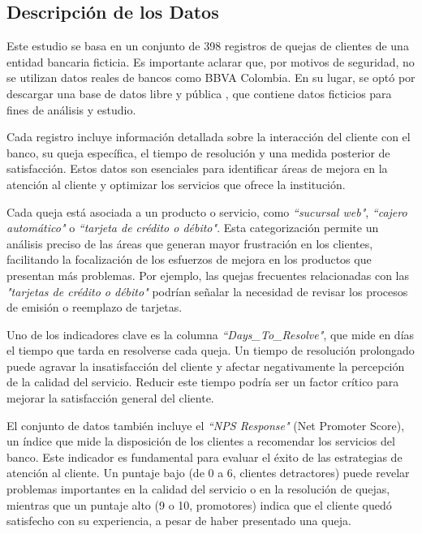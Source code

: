 \documentclass{matematicasud}
\begin{document}
\subsection{Descripción de los Datos}

Este estudio se basa en un conjunto de 398 registros de quejas de clientes de una entidad bancaria ficticia. Es importante aclarar que, por motivos de seguridad, no se utilizan datos reales de bancos como BBVA Colombia. En su lugar, se optó por descargar una base de datos libre y pública \cite{7}, que contiene datos ficticios para fines de análisis y estudio.

Cada registro incluye información detallada sobre la interacción del cliente con el banco, su queja específica, el tiempo de resolución y una medida posterior de satisfacción. Estos datos son esenciales para identificar áreas de mejora en la atención al cliente y optimizar los servicios que ofrece la institución.

Cada queja está asociada a un producto o servicio, como \textit{``sucursal web"}, \textit{``cajero automático"} o \textit{``tarjeta de crédito o débito"}. Esta categorización permite un análisis preciso de las áreas que generan mayor frustración en los clientes, facilitando la focalización de los esfuerzos de mejora en los productos que presentan más problemas. Por ejemplo, las quejas frecuentes relacionadas con las \textit{"tarjetas de crédito o débito"} podrían señalar la necesidad de revisar los procesos de emisión o reemplazo de tarjetas.

Uno de los indicadores clave es la columna \textit{``Days\_To\_Resolve"}, que mide en días el tiempo que tarda en resolverse cada queja. Un tiempo de resolución prolongado puede agravar la insatisfacción del cliente y afectar negativamente la percepción de la calidad del servicio. Reducir este tiempo podría ser un factor crítico para mejorar la satisfacción general del cliente.

El conjunto de datos también incluye el \textit{``NPS Response"} (Net Promoter Score)\cite{5}, un índice que mide la disposición de los clientes a recomendar los servicios del banco. Este indicador es fundamental para evaluar el éxito de las estrategias de atención al cliente. Un puntaje bajo (de 0 a 6, clientes detractores) puede revelar problemas importantes en la calidad del servicio o en la resolución de quejas, mientras que un puntaje alto (9 o 10, promotores) indica que el cliente quedó satisfecho con su experiencia, a pesar de haber presentado una queja.
\end{document}
